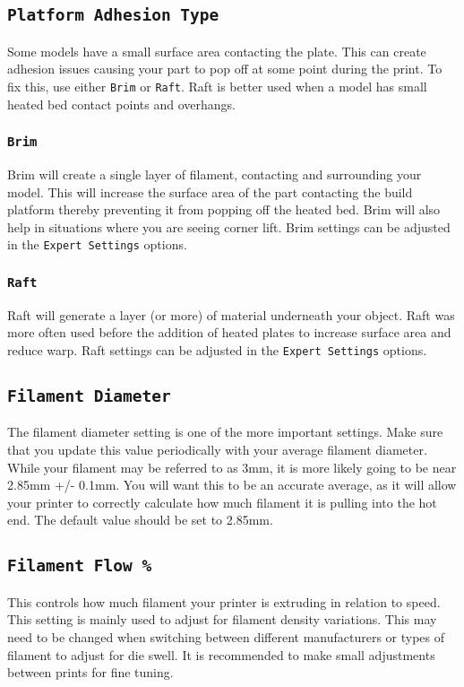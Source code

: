 \subsection{\texttt{Platform Adhesion Type}}
Some models have a small surface area contacting the plate. This can create adhesion issues causing your part to pop off at some point during the print. To fix this, use either \texttt{Brim} or \texttt{Raft}. Raft is better used when a model has small heated bed contact points and overhangs.

\subsubsection{\texttt{Brim}}
Brim will create a single layer of filament, contacting and surrounding your model. This will increase the surface area of the part contacting the build platform thereby preventing it from popping off the heated bed. Brim will also help in situations where you are seeing corner lift. Brim settings can be adjusted in the \texttt{Expert Settings} options. %

\subsubsection{\texttt{Raft}}
Raft will generate a layer (or more) of material underneath your object. Raft was more often used before the addition of heated plates to increase surface area and reduce warp. Raft settings can be adjusted in the \texttt{Expert Settings} options.

\subsection{\texttt{Filament Diameter}}
The filament diameter setting is one of the more important settings. Make sure that you update this value periodically with your average filament diameter. While your filament may be referred to as 3mm, it is more likely going to be near 2.85mm +/- 0.1mm. You will want this to be an accurate average, as it will allow your printer to correctly calculate how much filament it is pulling into the hot end. The default value should be set to 2.85mm.

\subsection{\texttt{Filament Flow \%}}
This controls how much filament your printer is extruding in relation to speed. This setting is mainly used to adjust for filament density variations. This may need to be changed when switching between different manufacturers or types of filament to adjust for die swell. It is recommended to make small adjustments between prints for fine tuning.

